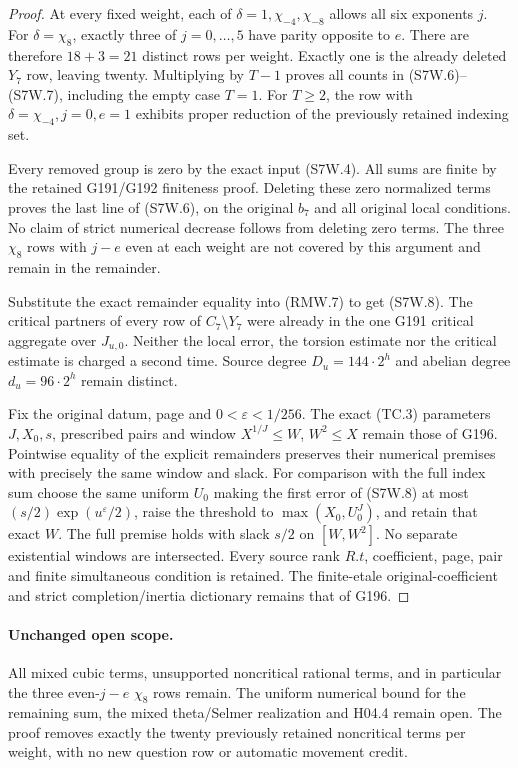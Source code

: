\begin{proof}
At every fixed weight, each of $\delta=1,\chi_{-4},\chi_{-8}$
allows all six exponents $j$. For $\delta=\chi_8$, exactly three
of $j=0,\ldots,5$ have parity opposite to $e$.
There are therefore $18+3=21$ distinct rows per weight.
Exactly one is the already deleted $Y_7$ row, leaving twenty.
Multiplying by $T-1$ proves all counts in (S7W.6)--(S7W.7),
including the empty case $T=1$.
For $T\geq2$, the row with $\delta=\chi_{-4},j=0,e=1$
exhibits proper reduction of the previously retained indexing set.

Every removed group is zero by the exact input (S7W.4).
All sums are finite by the retained G191/G192 finiteness proof.
Deleting these zero normalized terms proves the last line of
(S7W.6), on the original $b_7$ and all original local conditions.
No claim of strict numerical decrease follows from deleting
zero terms. The three $\chi_8$ rows with $j-e$ even at each weight
are not covered by this argument and remain in the remainder.

Substitute the exact remainder equality into (RMW.7) to get
(S7W.8). The critical partners of every row of $C_7\setminus Y_7$
were already in the one G191 critical aggregate over $J_{u,0}$.
Neither the local error, the torsion estimate nor the critical
estimate is charged a second time. Source degree $D_u=144\cdot2^h$
and abelian degree $d_u=96\cdot2^h$ remain distinct.

Fix the original datum, page and $0<\varepsilon<1/256$.
The exact (TC.3) parameters $J,X_0,s$, prescribed pairs and
window $X^{1/J}\leq W$, $W^2\leq X$ remain those of G196.
Pointwise equality of the explicit remainders preserves their
numerical premises with precisely the same window and slack.
For comparison with the full index sum choose the same uniform
$U_0$ making the first error of (S7W.8) at most
$(s/2)\exp(u^\varepsilon/2)$, raise the threshold to
$\max(X_0,U_0^J)$, and retain that exact $W$.
The full premise holds with slack $s/2$ on $[W,W^2]$.
No separate existential windows are intersected. Every source
rank $R.t$, coefficient, page, pair and finite simultaneous
condition is retained. The finite-etale original-coefficient
and strict completion/inertia dictionary remains that of G196.
\end{proof}

\paragraph{Unchanged open scope.}
All mixed cubic terms, unsupported noncritical rational terms,
and in particular the three even-$j-e$ $\chi_8$ rows remain.
The uniform numerical bound for the remaining sum, the mixed
theta/Selmer realization and H04.4 remain open. The proof removes
exactly the twenty previously retained noncritical terms per weight,
with no new question row or automatic movement credit.
